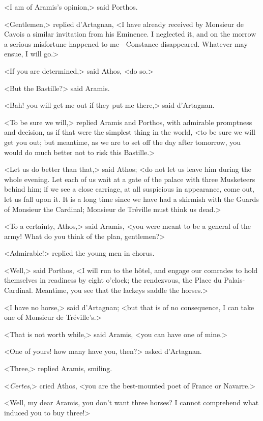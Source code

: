 <I am of Aramis's opinion,> said Porthos. 

<Gentlemen,> replied d'Artagnan, <I have already received by Monsieur de Cavois a similar invitation from his Eminence. I neglected it, and on the morrow a serious misfortune happened to me---Constance disappeared. Whatever may ensue, I will go.> 

<If you are determined,> said Athos, <do so.> 

<But the Bastille?> said Aramis. 

<Bah! you will get me out if they put me there,> said d'Artagnan. 

<To be sure we will,> replied Aramis and Porthos, with admirable promptness and decision, as if that were the simplest thing in the world, <to be sure we will get you out; but meantime, as we are to set off the day after tomorrow, you would do much better not to risk this Bastille.> 

<Let us do better than that,> said Athos; <do not let us leave him during the whole evening. Let each of us wait at a gate of the palace with three Musketeers behind him; if we see a close carriage, at all suspicious in appearance, come out, let us fall upon it. It is a long time since we have had a skirmish with the Guards of Monsieur the Cardinal; Monsieur de Tréville must think us dead.> 

<To a certainty, Athos,> said Aramis, <you were meant to be a general of the army! What do you think of the plan, gentlemen?> 

<Admirable!> replied the young men in chorus. 

<Well,> said Porthos, <I will run to the hôtel, and engage our comrades to hold themselves in readiness by eight o'clock; the rendezvous, the Place du Palais-Cardinal. Meantime, you see that the lackeys saddle the horses.> 

<I have no horse,> said d'Artagnan; <but that is of no consequence, I can take one of Monsieur de Tréville's.> 

<That is not worth while,> said Aramis, <you can have one of mine.> 

<One of yours! how many have you, then?> asked d'Artagnan. 

<Three,> replied Aramis, smiling. 

<\textit{Certes},> cried Athos, <you are the best-mounted poet of France or Navarre.> 

<Well, my dear Aramis, you don't want three horses? I cannot comprehend what induced you to buy three!> 

